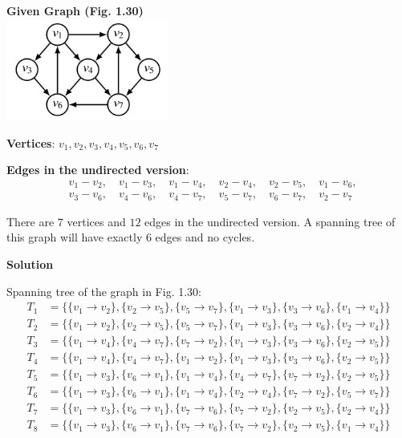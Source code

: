 \documentclass{article}
\begin{document}
\textbf{Given Graph (Fig. 1.30)}\\
\includegraphics[width=0.4\textwidth]{Fig_1_30.png}

\textbf{Vertices}: $v_1, v_2, v_3, v_4, v_5, v_6, v_7$

\textbf{Edges in the undirected version}:
\[
\begin{aligned}
&v_1 - v_2,\quad v_1 - v_3,\quad v_1 - v_4,\quad v_2 - v_4,\quad v_2 - v_5, \quad v_1 - v_6, \\
&v_3 - v_6,\quad v_4 - v_6,\quad v_4 - v_7,\quad v_5 - v_7,\quad v_6 - v_7, \quad v_2 - v_7
\end{aligned}
\]

There are $7$ vertices and $12$ edges in the undirected version. A spanning tree of this graph will have exactly $6$ edges and no cycles.

\textbf{Solution}

Spanning tree of the graph in Fig. 1.30:
\begin{align*}
    T_1 &= \{ \{v_1 \to v_2\}, \{v_2 \to v_5\}, \{v_5 \to v_7\}, \{v_1 \to v_3\}, \{v_3 \to v_6\}, \{v_1 \to v_4\} \} \\
    T_2 &= \{ \{v_1 \to v_2\}, \{v_2 \to v_5\}, \{v_5 \to v_7\}, \{v_1 \to v_3\}, \{v_3 \to v_6\}, \{v_2 \to v_4\} \} \\
    T_3 &= \{ \{v_1 \to v_4\}, \{v_4 \to v_7\}, \{v_7 \to v_2\}, \{v_1 \to v_3\}, \{v_3 \to v_6\}, \{v_2 \to v_5\} \} \\
    T_4 &= \{ \{v_1 \to v_4\}, \{v_4 \to v_7\}, \{v_1 \to v_2\}, \{v_1 \to v_3\}, \{v_3 \to v_6\}, \{v_2 \to v_5\} \} \\
    T_5 &= \{ \{v_1 \to v_3\}, \{v_6 \to v_1\}, \{v_1 \to v_4\}, \{v_4 \to v_7\}, \{v_7 \to v_2\}, \{v_2 \to v_5\} \} \\
    T_6 &= \{ \{v_1 \to v_3\}, \{v_6 \to v_1\}, \{v_1 \to v_4\}, \{v_2 \to v_4\}, \{v_7 \to v_2\}, \{v_5 \to v_7\} \} \\
    T_7 &= \{ \{v_1 \to v_3\}, \{v_6 \to v_1\}, \{v_7 \to v_6\}, \{v_7 \to v_2\}, \{v_2 \to v_5\}, \{v_2 \to v_4\} \} \\
    T_8 &= \{ \{v_1 \to v_3\}, \{v_6 \to v_1\}, \{v_7 \to v_6\}, \{v_7 \to v_2\}, \{v_2 \to v_5\}, \{v_1 \to v_4\} \} \\
\end{align*}
\end{document}
